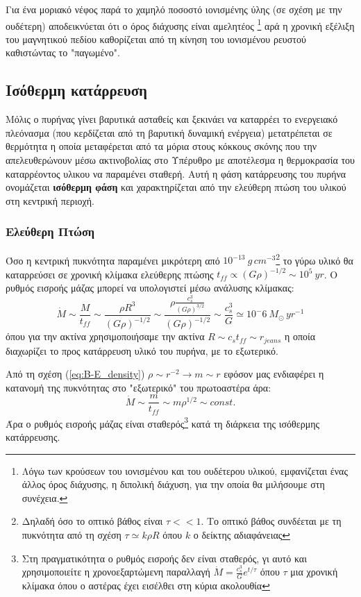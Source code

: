 Για ένα μοριακό νέφος παρά το χαμηλό ποσοστό ιονισμένης ύλης (σε σχέση με την ουδέτερη) αποδεικνύεται ότι ο όρος διάχυσης είναι αμελητέος \footnote{Λόγω των κρούσεων του ιονισμένου και του ουδέτερου υλικού, εμφανίζεται ένας άλλος όρος διάχυσης, η διπολική διάχυση, για την οποία θα μιλήσουμε στη συνέχεια.} αρά η χρονική εξέλιξη του μαγνητικού πεδίου καθορίζεται από τη κίνηση του ιονισμένου ρευστού καθιστώντας το "παγωμένο".


\subsection{Ισόθερμη κατάρρευση}
Μόλις ο πυρήνας γίνει βαρυτικά ασταθείς και ξεκινάει να καταρρέει το ενεργειακό πλεόνασμα (που κερδίζεται από τη βαρυτική δυναμική ενέργεια) μετατρέπεται σε θερμότητα η οποία μεταφέρεται από τα μόρια στους κόκκους σκόνης που την απελευθερώνουν μέσω ακτινοβολίας στο Υπέρυθρο με αποτέλεσμα η θερμοκρασία του καταρρέοντος υλικου να παραμένει σταθερή. Αυτή η φάση κατάρρευσης του πυρήνα ονομάζεται \textbf{ισόθερμη φάση} και χαρακτηρίζεται από την ελεύθερη πτώση του υλικού στη κεντρική περιοχή.


\subsubsection{Ελεύθερη Πτώση}
Όσο η κεντρική πυκνότητα παραμένει μικρότερη από $10^{-13} \ g \, cm^{-3}$\footnote{Δηλαδή όσο το οπτικό βάθος είναι $\tau<<1$. Το οπτικό βάθος συνδέεται με τη πυκνότητα από τη σχέση $\tau \simeq k \rho R$ όπου $k$ ο δείκτης αδιαφάνειας} το γύρω υλικό θα καταρρεύσει σε χρονική κλίμακα ελεύθερης πτώσης $t_{ff} \propto (G \rho)^{-1/2} \sim 10^5 \ yr$. 
Ο ρυθμός εισροής μάζας μπορεί να υπολογιστεί μέσω ανάλυσης κλίμακας: 
\begin{equation}
\dot{M} \sim \frac{M}{t_{ff}} \sim \frac{\rho R^3}{(G \rho)^{-1/2}} \sim \frac{\rho \frac{c_s ^3}{(G \rho)^{3/2}}}{(G \rho)^{-1/2}} \sim \frac{c_s ^3}{G} \simeq 10^-6 \  M_{\odot} \, yr^{-1} 
\end{equation}
όπου για την ακτίνα χρησιμοποιήσαμε την ακτίνα $R \sim c_s t_{ff} \sim r_{jeans}$ η οποία διαχωρίζει το προς κατάρρευση υλικό του πυρήνα, με το εξωτερικό.


Από τη σχέση (\ref{eq:B-E_density}) $\rho \sim r^{-2} \rightarrow m \sim r$ εφόσον μας ενδιαφέρει η κατανομή της πυκνότητας στο "εξωτερικό" του πρωτοαστέρα άρα: 
\begin{equation}
\dot{M} \sim \frac{m}{t_{ff}} \sim m \rho^{1/2} \sim const.
\end{equation}
Άρα ο ρυθμός εισροής μάζας είναι σταθερός\footnote{Στη πραγματικότητα ο ρυθμός εισροής δεν είναι σταθερός, γι αυτό και χρησιμοποιείτε η χρονοεξαρτώμενη παραλλαγή $\dot{M}=\frac{c_s ^3}{G} e^{t/\tau}$ όπου $\tau$ μια χρονική κλίμακα όπου ο αστέρας έχει εισέλθει στη κύρια ακολουθία} κατά τη διάρκεια της ισόθερμης κατάρρευσης.


